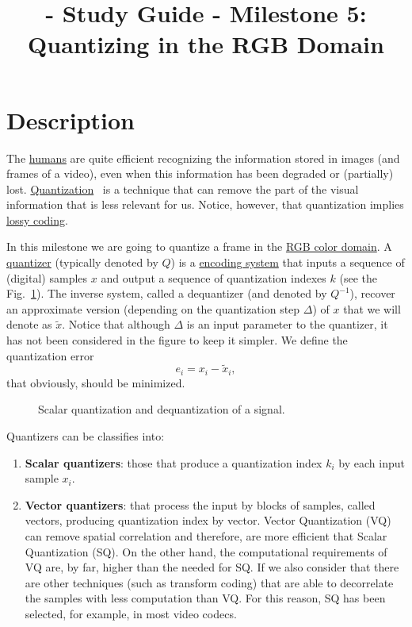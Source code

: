
\title{\SM{} - Study Guide - Milestone 5: Quantizing in the RGB Domain}

\maketitle

\section{Description}
The \href{https://en.wikipedia.org/wiki/Visual_system}{humans} are
quite efficient recognizing the information stored in images (and
frames of a video), even when this information has been degraded or
(partially)
lost. \href{https://en.wikipedia.org/wiki/Quantization_(signal_processing)}{Quantization}~\cite{sayood2017introduction,vetterli2014foundations}
is a technique that can remove the part of the visual information that
is less relevant for us. Notice, however, that quantization implies
\href{https://en.wikipedia.org/wiki/Lossy_compression}{lossy coding}.

In this milestone we are going to quantize a frame in
the \href{https://en.wikipedia.org/wiki/RGB_color_model}{RGB color
domain}. A \href{https://en.wikipedia.org/wiki/Quantization_(signal_processing)}{quantizer}
(typically denoted by $Q$) is
a \href{https://en.wikipedia.org/wiki/Data_compression}{encoding
system} that inputs a sequence of (digital) samples $x$ and output a
sequence of quantization indexes $k$ (see the Fig.~\ref{fig:Q}). The
inverse system, called a dequantizer (and denoted by $Q^{-1}$),
recover an approximate version (depending on the quantization step
$\Delta$) of $x$ that we will denote as $\tilde{x}$. Notice that
although $\Delta$ is an input parameter to the quantizer, it has not
been considered in the figure to keep it simpler. We define the
quantization error
\begin{equation}
  e_i = x_i - \tilde{x}_i,
\end{equation}
that obviously, should be minimized.

\begin{figure}
  \centering
  \caption{Scalar quantization and dequantization of a signal.}
  \label{fig:Q}
\end{figure}

Quantizers can be classifies into:
\begin{enumerate}
\item \textbf{Scalar quantizers}: those that produce a quantization
  index $k_i$ by each input sample $x_i$.
\item \textbf{Vector quantizers}: that process the input by
  blocks of samples, called vectors, producing quantization index by
  vector. Vector Quantization (VQ) can remove spatial correlation and
  therefore, are more efficient that Scalar Quantization (SQ). On the
  other hand, the computational requirements of VQ are, by far, higher
  than the needed for SQ. If we also consider that there are other
  techniques (such as transform coding) that are able to decorrelate
  the samples with less computation than VQ. For this reason, SQ has
  been selected, for example, in most video codecs.
\end{enumerate}

